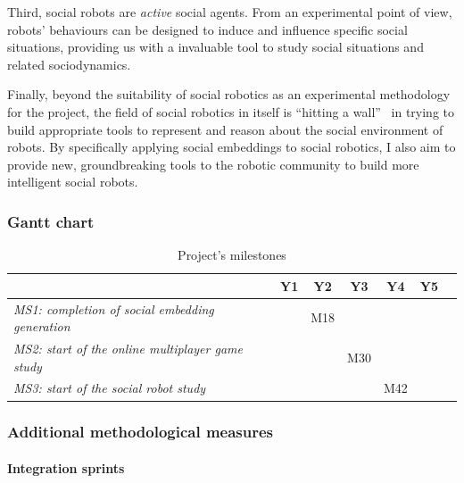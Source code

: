 Third, social robots are \emph{active} social agents. From an experimental point
of view, robots' behaviours can be
designed to induce and influence specific social situations, providing us with a
invaluable tool to study social situations and related sociodynamics.

Finally, beyond the suitability of social robotics as an experimental
methodology for the \project project, the field of social robotics in itself is
``hitting a wall''~\cite{yang2018grand} in trying to build appropriate tools to represent and
reason about the social environment of robots. By specifically applying social
embeddings to social robotics, I also aim to provide new, groundbreaking
tools to the robotic community to build more intelligent social robots.

\subsubsection{Gantt chart}

\resizebox{\linewidth}{!}{
    
}
\label{gantt}

\begin{table}[h!]
    \centering
\begin{tabular}{@{}lcccccr@{}}
\toprule
\textit{\textbf{}}              & \textbf{Y1} & \textbf{Y2} & \textbf{Y3} & \textbf{Y4} & \textbf{Y5} \\ \midrule
\textit{MS1: completion of social embedding generation} &   & M18  &    &   &    &     \\ 
\textit{MS2: start of the online multiplayer game study} &   &    & M30  &   &    &     \\ 
\textit{MS3: start of the social robot study} &   &    &    &M42   &     \\ \bottomrule
\end{tabular}
    \caption{Project's milestones}
    \label{milestones}
\end{table}

\subsubsection{Additional methodological measures}

\paragraph{Integration sprints}

